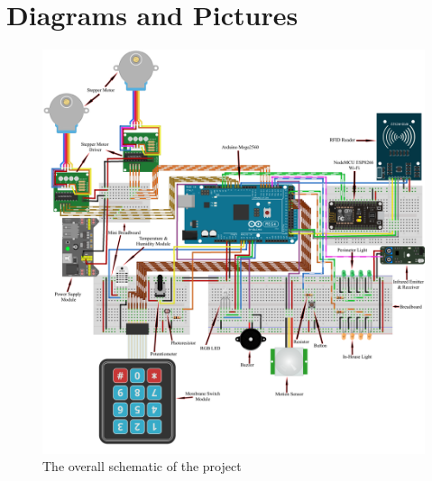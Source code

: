 \documentclass[journal,onecolumn]{IEEEtran}
\begin{document}
\appendices
\section{Diagrams and Pictures}

\begin{figure}[H]
  \includegraphics[width=\textwidth]{img/img1.png}
  \caption{The overall schematic of the project}
  \label{fig:img1}
\end{figure}



%

\ifCLASSOPTIONcaptionsoff
  \newpage
\fi

\end{document}

